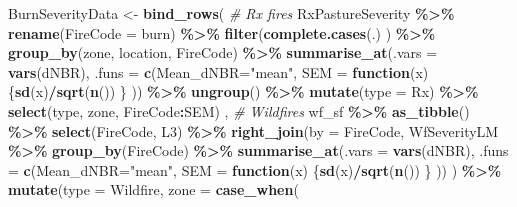 \documentclass[
]{article}
\newenvironment{Shaded}{\begin{snugshade}}{\end{snugshade}}
\newcommand{\AttributeTok}[1]{\textcolor[rgb]{0.13,0.29,0.53}{#1}}
\newcommand{\CommentTok}[1]{\textcolor[rgb]{0.56,0.35,0.01}{\textit{#1}}}
\newcommand{\ControlFlowTok}[1]{\textcolor[rgb]{0.13,0.29,0.53}{\textbf{#1}}}
\newcommand{\FunctionTok}[1]{\textcolor[rgb]{0.13,0.29,0.53}{\textbf{#1}}}
\newcommand{\NormalTok}[1]{#1}
\newcommand{\OtherTok}[1]{\textcolor[rgb]{0.56,0.35,0.01}{#1}}
\newcommand{\SpecialCharTok}[1]{\textcolor[rgb]{0.81,0.36,0.00}{\textbf{#1}}}
\newcommand{\StringTok}[1]{\textcolor[rgb]{0.31,0.60,0.02}{#1}}
\begin{document}
\begin{Shaded}
\begin{Highlighting}[]
\NormalTok{BurnSeverityData }\OtherTok{\textless{}{-}} 
  \FunctionTok{bind\_rows}\NormalTok{(}
    \CommentTok{\# Rx fires}
\NormalTok{    RxPastureSeverity }\SpecialCharTok{\%\textgreater{}\%}
      \FunctionTok{rename}\NormalTok{(}\AttributeTok{FireCode =}\NormalTok{ burn) }\SpecialCharTok{\%\textgreater{}\%}
        \FunctionTok{filter}\NormalTok{(}\FunctionTok{complete.cases}\NormalTok{(.) ) }\SpecialCharTok{\%\textgreater{}\%}
        \FunctionTok{group\_by}\NormalTok{(zone, location, FireCode) }\SpecialCharTok{\%\textgreater{}\%}
        \FunctionTok{summarise\_at}\NormalTok{(}\AttributeTok{.vars =} \FunctionTok{vars}\NormalTok{(dNBR),}
                     \AttributeTok{.funs =} \FunctionTok{c}\NormalTok{(}\AttributeTok{Mean\_dNBR=}\StringTok{"mean"}\NormalTok{, }
                               \AttributeTok{SEM =} \ControlFlowTok{function}\NormalTok{(x) \{}\FunctionTok{sd}\NormalTok{(x)}\SpecialCharTok{/}\FunctionTok{sqrt}\NormalTok{(}\FunctionTok{n}\NormalTok{()) \} )) }\SpecialCharTok{\%\textgreater{}\%}
        \FunctionTok{ungroup}\NormalTok{() }\SpecialCharTok{\%\textgreater{}\%}
        \FunctionTok{mutate}\NormalTok{(}\AttributeTok{type =} \StringTok{\textquotesingle{}Rx\textquotesingle{}}\NormalTok{) }\SpecialCharTok{\%\textgreater{}\%}
         \FunctionTok{select}\NormalTok{(type, zone, FireCode}\SpecialCharTok{:}\NormalTok{SEM) , }
    \CommentTok{\# Wildfires}
\NormalTok{      wf\_sf }\SpecialCharTok{\%\textgreater{}\%}
        \FunctionTok{as\_tibble}\NormalTok{() }\SpecialCharTok{\%\textgreater{}\%}
        \FunctionTok{select}\NormalTok{(FireCode, L3) }\SpecialCharTok{\%\textgreater{}\%}
      \FunctionTok{right\_join}\NormalTok{(}\AttributeTok{by =} \StringTok{\textquotesingle{}FireCode\textquotesingle{}}\NormalTok{, }
\NormalTok{        WfSeverityLM }\SpecialCharTok{\%\textgreater{}\%}
          \FunctionTok{group\_by}\NormalTok{(FireCode) }\SpecialCharTok{\%\textgreater{}\%}
          \FunctionTok{summarise\_at}\NormalTok{(}\AttributeTok{.vars =} \FunctionTok{vars}\NormalTok{(dNBR),}
                       \AttributeTok{.funs =} \FunctionTok{c}\NormalTok{(}\AttributeTok{Mean\_dNBR=}\StringTok{"mean"}\NormalTok{, }
                                 \AttributeTok{SEM =} \ControlFlowTok{function}\NormalTok{(x) \{}\FunctionTok{sd}\NormalTok{(x)}\SpecialCharTok{/}\FunctionTok{sqrt}\NormalTok{(}\FunctionTok{n}\NormalTok{()) \} )) ) }\SpecialCharTok{\%\textgreater{}\%}
         \FunctionTok{mutate}\NormalTok{(}\AttributeTok{type =} \StringTok{\textquotesingle{}Wildfire\textquotesingle{}}\NormalTok{, }
                \AttributeTok{zone =} \FunctionTok{case\_when}\NormalTok{(}

\end{Highlighting}
\end{Shaded}
\end{document}
